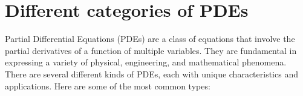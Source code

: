 \documentclass[a4paper,12pt]{article} %
\begin{document}
\subsection{}


\section{\textbf{Different categories of PDEs}}

Partial Differential Equations (PDEs) are a class of equations that involve the partial derivatives of a function of multiple variables. They are fundamental in expressing a variety of physical, engineering, and mathematical phenomena. There are several different kinds of PDEs, each with unique characteristics and applications. Here are some of the most common types:
\end{document}
